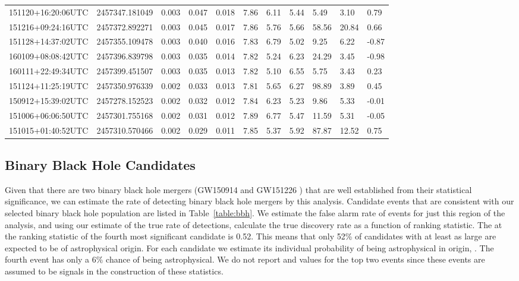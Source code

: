\begin{table}[ht!]
\begin{tabularx}{1.0\textwidth}{lllllllllll}
151120+16:20:06UTC & 2457347.181049 & 0.003 & 0.047 &      0.018 & 7.86 & 6.11 & 5.44 & 5.49 & 3.10 & 0.79\\
151216+09:24:16UTC & 2457372.892271 & 0.003 & 0.045 &      0.017 & 7.86 & 5.76 & 5.66 & 58.56 & 20.84 & 0.66\\
151128+14:37:02UTC & 2457355.109478 & 0.003 & 0.040 &      0.016 & 7.83 & 6.79 & 5.02 & 9.25 & 6.22 & -0.87\\
160109+08:08:42UTC & 2457396.839798 & 0.003 & 0.035 &      0.014 & 7.82 & 5.24 & 6.23 & 24.29 & 3.45 & -0.98\\
160111+22:49:34UTC & 2457399.451507 & 0.003 & 0.035 &      0.013 & 7.82 & 5.10 & 6.55 & 5.75 & 3.43 & 0.23\\
151124+11:25:19UTC & 2457350.976339 & 0.002 & 0.033 &      0.013 & 7.81 & 5.65 & 6.27 & 98.89 & 3.89 & 0.45\\
150912+15:39:02UTC & 2457278.152523 & 0.002 & 0.032 &      0.012 & 7.84 & 6.23 & 5.23 & 9.86 & 5.33 & -0.01\\
151006+06:06:50UTC & 2457301.755168 & 0.002 & 0.031 &      0.012 & 7.89 & 6.77 & 5.47 & 11.59 & 5.31 & -0.05\\
151015+01:40:52UTC & 2457310.570466 & 0.002 & 0.029 &      0.011 & 7.85 & 5.37 & 5.92 & 87.87 & 12.52 & 0.75\\

\end{tabularx}
\end{table}

\subsection{Binary Black Hole Candidates}

Given that there are two binary black hole mergers (GW150914 and GW151226 ) that are well established from their
statistical significance, we can estimate the rate of detecting binary black hole mergers by this analysis. Candidate
events that are consistent with our selected binary black hole population are listed in
Table~\ref{table:bbh}. We estimate the false alarm rate of events for just this region of the analysis, and using our
estimate of the true rate of detections, calculate the true discovery rate as a function of ranking statistic. The
\tdr{} at the ranking statistic of the fourth most significant candidate is 0.52. This means that only 52\% of
candidates with \rankingstat{} at least as large are expected to be of astrophysical origin. For each candidate we estimate its
individual probability of being astrophysical in origin, \pastro{}. The fourth event has only a 6$\%$ chance of being
astrophysical. We do not report \pastro{} and \tdr{} values for the top two events since these events
are assumed to be signals in the construction of these statistics.


